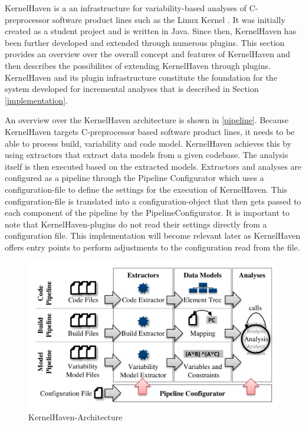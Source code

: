\documentclass[a4paper]{article}
\begin{document}
KernelHaven is a an infrastructure for variability-based analyses of C-preprocessor software product lines such as the Linux Kernel \cite{KroeherEl-SharkawySchmid18}. It was initially created as a student project and is written in Java.  Since then, KernelHaven has been further developed and extended through numerous plugins. This section  provides an overview over the overall concept and features of KernelHaven and then describes the possibilites of extending KernelHaven through plugins. KernelHaven and its plugin infrastructure constitute the foundation for the system developed for incremental analyses that is described in Section \ref{implementation}. 

An overview over the KernelHaven architecture is shown in \autoref{pipeline}. Because KernelHaven targets C-preprocessor based software product lines, it needs to be able to process build, variability and code model. KernelHaven achieves this by using extractors that extract data models from a given codebase. The analysis itself is then executed based on the extracted models. Extractors and analyses are configured as a pipeline through the Pipeline Configurator which uses a configuration-file to define the settings for the execution of KernelHaven. This configuration-file is translated into a configuration-object that then gets passed to each component of the pipeline by the PipelineConfigurator. It is  important to note that KernelHaven-plugins do not read their settings directly from a configuration file. This implementation will become relevant later as KernelHaven offers entry points to perform adjustments to the configuration read from the file.

\begin{figure}[h] 
  \centering
  \begin{minipage}[b]{1\textwidth} 
    \caption[KernelHaven-Pipeline]{KernelHaven-Architecture \cite{KroeherEl-SharkawySchmid18}}\label{pipeline}
    \includegraphics[width=1\textwidth]{img/KernelHaven-Pipeline.png}
  \end{minipage}
\end{figure}
\end{document}

